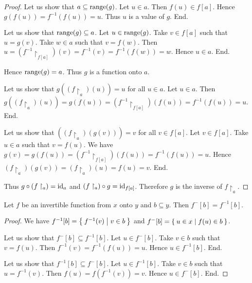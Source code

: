 \documentclass[../../set-theory.tex]{subfiles}
\begin{document}
\begin{forthel}
\begin{proof}
      Let us show that $a \subseteq \operatorname{range}(g)$.
        Let $u \in a$.
        Then $f(u) \in f[a]$.
        Hence $g(f(u)) = f^{-1}(f(u)) = u$.
        Thus $u$ is a value of $g$.
      End.

      Let us show that $\operatorname{range}(g) \subseteq a$.
        Let $u \in \operatorname{range}(g)$.
        Take $v \in f[a]$ such that $u = g(v)$.
        Take $w \in a$ such that $v = f(w)$.
        Then $u = (f^{-1} \restriction_{f[a]})(v) = f^{-1}(v) = f^{-1}(f(w)) = w$.
        Hence $u \in a$.
      End.

      Hence $\operatorname{range}(g) = a$.
      Thus $g$ is a function onto $a$.

      Let us show that $g((f \restriction_{a})(u)) = u$ for all $u \in a$.
        Let $u \in a$.
        Then $g((f \restriction_{a})(u)) = g(f(u)) = (f^{-1} \restriction_{f[a]})(f(u)) = f^{-1}(f(u)) = u$.
      End.

      Let us show that $((f \restriction_{a})(g(v))) = v$ for all $v \in f[a]$.
        Let $v \in f[a]$.
        Take $u \in a$ such that $v = f(u)$.
        We have $g(v) = g(f(u)) = (f^{-1} \restriction_{f[a]})(f(u)) = f^{-1}(f(u)) = u$.
        Hence $(f \restriction_{a})(g(v)) = (f \restriction_{a})(u) = f(u) = v$.
      End.

      Thus $g \circ (f \restriction_{a}) = \operatorname{id}_{a}$ and $(f \restriction_{a}) \circ g = \operatorname{id}_{f[a]}$.
      Therefore $g$ is the inverse of $f \restriction_{a}$.
    \end{proof}

    \begin{proposition}\label{SetTheory_02_03_293037}
      Let $f$ be an invertible function from $x$ onto $y$ and $b \subseteq y$.
      Then $f^{-}[b] = f^{-1}[b]$.
    \end{proposition}
    \begin{proof}
      We have $f^{-1}[b] = \Set{f^{-1}(v) | v \in b}$ and $f^{-}[b] = \Set{u \in x | f(u) \in b}$.

      Let us show that $f^{-}[b] \subseteq f^{-1}[b]$.
        Let $u \in f^{-}[b]$.
        Take $v \in b$ such that $v = f(u)$.
        Then $f^{-1}(v) = f^{-1}(f(u)) = u$.
        Hence $u \in f^{-1}[b]$.
      End.

      Let us show that $f^{-1}[b] \subseteq f^{-}[b]$.
        Let $u \in f^{-1}[b]$.
        Take $v \in b$ such that $u = f^{-1}(v)$.
        Then $f(u) = f(f^{-1}(v)) = v$.
        Hence $u \in f^{-}[b]$.
      End.
    \end{proof}


\end{forthel}
\end{document}
